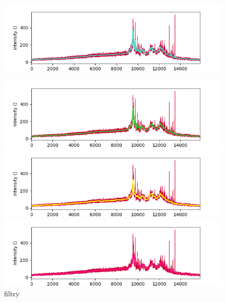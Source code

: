 \documentclass[a4paper, 12pt]{article}
\begin{document}
\begin{figure}[ht!]
\centering
\begin{minipage}[b]{0.9\linewidth}
  \centering
  \includegraphics[width=\linewidth]{zerophase_fig.png}\vspace{0.25cm}
  \label{fig:zerophase_fig}
\end{minipage}
\begin{minipage}[b]{0.9\linewidth}
  \centering
  \includegraphics[width=\linewidth]{sgf_fig.png}
\end{minipage}
\begin{minipage}[b]{0.9\linewidth}
  \centering
  \includegraphics[width=\linewidth]{median_fig.png}
\end{minipage}
\begin{minipage}[b]{0.9\linewidth}
  \centering
  \includegraphics[width=\linewidth]{ema_fig.png}
\end{minipage}\vspace{0.4cm}
\caption{filtry}
\label{fig:exp_filtry}
\end{figure}
\end{document}
